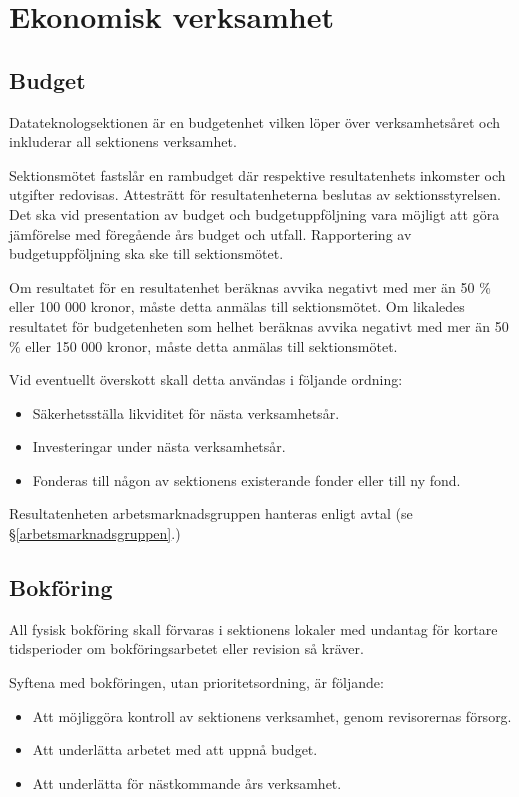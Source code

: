 \documentclass{datateknologsektionen-document}
\begin{document}
\section{Ekonomisk verksamhet}
\subsection{Budget}
Datateknologsektionen är en budgetenhet vilken löper över verksamhetsåret och
inkluderar all sektionens verksamhet.

Sektionsmötet fastslår en rambudget där respektive resultatenhets inkomster och
utgifter redovisas. Attesträtt för resultatenheterna beslutas av sektionsstyrelsen.
Det ska vid presentation av budget och budgetuppföljning vara möjligt att göra
jämförelse med föregående års budget och utfall. Rapportering av budgetuppföljning
ska ske till sektionsmötet.

Om resultatet för en resultatenhet beräknas avvika negativt med mer än 50 \% eller
100 000 kronor, måste detta anmälas till sektionsmötet. Om likaledes resultatet för
budgetenheten som helhet beräknas avvika negativt med mer än 50 \% eller 150 000 kronor,
måste detta anmälas till sektionsmötet.

Vid eventuellt överskott skall detta användas i följande ordning:
\begin{itemize}
  \item Säkerhetsställa likviditet för nästa verksamhetsår.
  \item Investeringar under nästa verksamhetsår.
  \item Fonderas till någon av sektionens existerande fonder eller till ny fond.
\end{itemize}

Resultatenheten arbetsmarknadsgruppen hanteras enligt avtal (se \S \ref{arbetsmarknadsgruppen}.)

\subsection{Bokföring}
All fysisk bokföring skall förvaras i sektionens lokaler med undantag för kortare
tidsperioder om bokföringsarbetet eller revision så kräver.

Syftena med bokföringen, utan prioritetsordning, är följande:
\begin{itemize}
  \item Att möjliggöra kontroll av sektionens verksamhet, genom revisorernas försorg.
  \item Att underlätta arbetet med att uppnå budget.
  \item Att underlätta för nästkommande års verksamhet.
\end{itemize}
\end{document}
